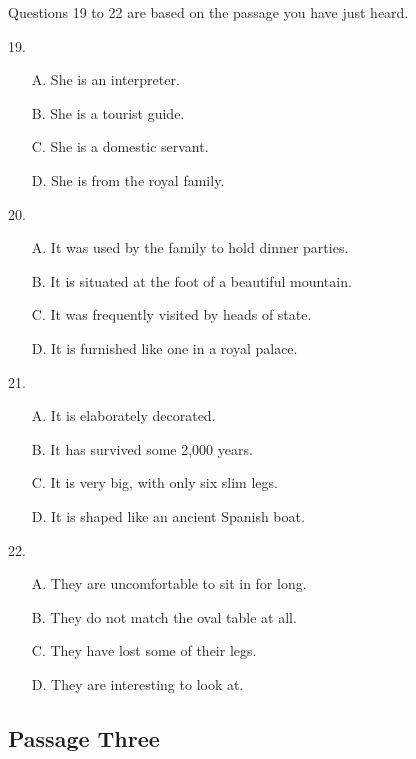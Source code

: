 \documentclass[UTF8,11pt]{ctexart}
\begin{document}
Questions 19 to 22 are based on the passage you have just heard.


19.


\begin{itemize}[leftmargin=2em,itemsep=.2em,topsep=.4em]\item[A.] She is an interpreter.
\item[B.] She is a tourist guide.
\item[C.] She is a domestic servant.
\item[D.] She is from the royal family.
\end{itemize}

20.


\begin{itemize}[leftmargin=2em,itemsep=.2em,topsep=.4em]\item[A.] It was used by the family to hold dinner parties.
\item[B.] It is situated at the foot of a beautiful mountain.
\item[C.] It was frequently visited by heads of state.
\item[D.] It is furnished like one in a royal palace.
\end{itemize}

21.


\begin{itemize}[leftmargin=2em,itemsep=.2em,topsep=.4em]\item[A.] It is elaborately decorated.
\item[B.] It has survived some 2,000 years.
\item[C.] It is very big, with only six slim legs.
\item[D.] It is shaped like an ancient Spanish boat.
\end{itemize}

22.


\begin{itemize}[leftmargin=2em,itemsep=.2em,topsep=.4em]\item[A.] They are uncomfortable to sit in for long.
\item[B.] They do not match the oval table at all.
\item[C.] They have lost some of their legs.
\item[D.] They are interesting to look at.
\end{itemize}

\subsection*{Passage Three}
\end{document}
